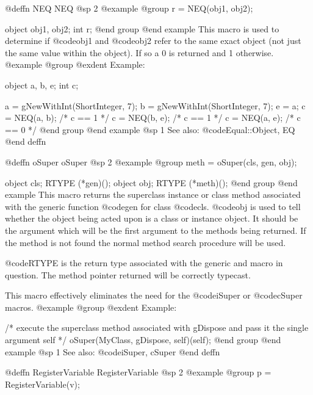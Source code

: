 {{{{@deffn {NEQ} NEQ
@sp 2
@example
@group
r = NEQ(obj1, obj2);

object  obj1, obj2;
int     r;
@end group
@end example
This macro is used to determine if @code{obj1} and @code{obj2} refer to
the same exact object (not just the same value within the object).  If
so a 0 is returned and 1 otherwise.
@example
@group
@exdent Example:

object  a, b, e;
int     c;

a = gNewWithInt(ShortInteger, 7);
b = gNewWithInt(ShortInteger, 7);
e = a;
c = NEQ(a, b);   /* c == 1  */
c = NEQ(b, e);   /* c == 1  */
c = NEQ(a, e);   /* c == 0  */
@end group
@end example
@sp 1
See also:  @code{Equal::Object, EQ}
@end deffn















@deffn {oSuper} oSuper
@sp 2
@example
@group
meth = oSuper(cls, gen, obj);

object  cls;
RTYPE   (*gen)();
object  obj;     
RTYPE   (*meth)();
@end group
@end example
This macro returns the superclass instance or class method associated
with the generic function @code{gen} for class @code{cls}.  @code{obj}
is used to tell whether the object being acted upon is a class or
instance object.  It should be the argument which will be the first
argument to the methods being returned.  If the method is not found the
normal method search procedure will be used.

@code{RTYPE} is the return type associated with the generic and
macro in question.  The method pointer returned will be correctly
typecast.

This macro effectively eliminates the need for the @code{iSuper} or
@code{cSuper} macros.  
@example
@group
@exdent Example:

 /* execute the superclass
    method associated with gDispose
    and pass it the single argument self  */
oSuper(MyClass, gDispose, self)(self);
@end group
@end example
@sp 1
See also:  @code{iSuper, cSuper}
@end deffn













@deffn {RegisterVariable} RegisterVariable
@sp 2
@example
@group
p = RegisterVariable(v);

}}}}
